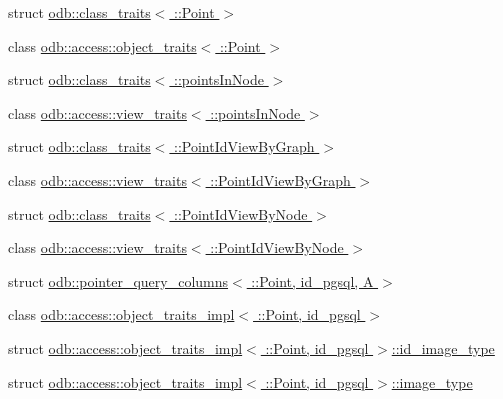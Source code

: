 \begin{DoxyCompactItemize}
\item 
struct \hyperlink{structodb_1_1class__traits_3_01_1_1_point_01_4}{odb\+::class\+\_\+traits$<$ \+::\+Point $>$}
\item 
class \hyperlink{classodb_1_1access_1_1object__traits_3_01_1_1_point_01_4}{odb\+::access\+::object\+\_\+traits$<$ \+::\+Point $>$}
\item 
struct \hyperlink{structodb_1_1class__traits_3_01_1_1points_in_node_01_4}{odb\+::class\+\_\+traits$<$ \+::points\+In\+Node $>$}
\item 
class \hyperlink{classodb_1_1access_1_1view__traits_3_01_1_1points_in_node_01_4}{odb\+::access\+::view\+\_\+traits$<$ \+::points\+In\+Node $>$}
\item 
struct \hyperlink{structodb_1_1class__traits_3_01_1_1_point_id_view_by_graph_01_4}{odb\+::class\+\_\+traits$<$ \+::\+Point\+Id\+View\+By\+Graph $>$}
\item 
class \hyperlink{classodb_1_1access_1_1view__traits_3_01_1_1_point_id_view_by_graph_01_4}{odb\+::access\+::view\+\_\+traits$<$ \+::\+Point\+Id\+View\+By\+Graph $>$}
\item 
struct \hyperlink{structodb_1_1class__traits_3_01_1_1_point_id_view_by_node_01_4}{odb\+::class\+\_\+traits$<$ \+::\+Point\+Id\+View\+By\+Node $>$}
\item 
class \hyperlink{classodb_1_1access_1_1view__traits_3_01_1_1_point_id_view_by_node_01_4}{odb\+::access\+::view\+\_\+traits$<$ \+::\+Point\+Id\+View\+By\+Node $>$}
\item 
struct \hyperlink{structodb_1_1pointer__query__columns_3_01_1_1_point_00_01id__pgsql_00_01_a_01_4}{odb\+::pointer\+\_\+query\+\_\+columns$<$ \+::\+Point, id\+\_\+pgsql, A $>$}
\item 
class \hyperlink{classodb_1_1access_1_1object__traits__impl_3_01_1_1_point_00_01id__pgsql_01_4}{odb\+::access\+::object\+\_\+traits\+\_\+impl$<$ \+::\+Point, id\+\_\+pgsql $>$}
\item 
struct \hyperlink{structodb_1_1access_1_1object__traits__impl_3_01_1_1_point_00_01id__pgsql_01_4_1_1id__image__type}{odb\+::access\+::object\+\_\+traits\+\_\+impl$<$ \+::\+Point, id\+\_\+pgsql $>$\+::id\+\_\+image\+\_\+type}
\item 
struct \hyperlink{structodb_1_1access_1_1object__traits__impl_3_01_1_1_point_00_01id__pgsql_01_4_1_1image__type}{odb\+::access\+::object\+\_\+traits\+\_\+impl$<$ \+::\+Point, id\+\_\+pgsql $>$\+::image\+\_\+type}
\item 

\end{DoxyCompactItemize}
